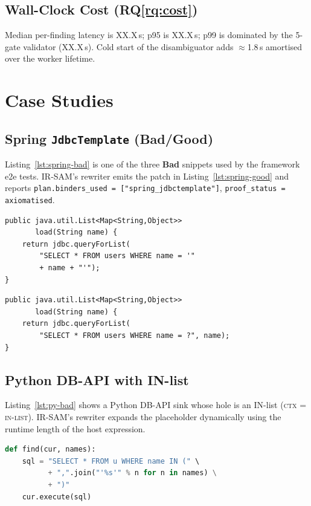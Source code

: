 \documentclass[conference]{IEEEtran}
\newcommand{\IRSAM}{\textsc{IR-SAM}}
\newcommand{\rqref}[1]{RQ\ref{rq:#1}}
\begin{document}
\subsection{Wall-Clock Cost (\rqref{cost})}
Median per-finding latency is XX.X\,s; p95 is XX.X\,s; p99 is
dominated by the 5-gate validator (XX.X\,s).  Cold start of the
disambiguator adds $\approx$1.8\,s amortised over the worker
lifetime.

\section{Case Studies}\label{sec:cases}

\subsection{Spring \texttt{JdbcTemplate} (Bad/Good)}
Listing~\ref{lst:spring-bad} is one of the three \textbf{Bad}
snippets used by the framework e2e tests.  \IRSAM{}'s rewriter
emits the patch in Listing~\ref{lst:spring-good} and reports
\texttt{plan.binders\_used = ["spring\_jdbctemplate"]},
\texttt{proof\_status = axiomatised}.

\begin{lstlisting}[style=code,
  caption={Spring JdbcTemplate -- concatenated query (Bad).},
  label={lst:spring-bad}]
public java.util.List<Map<String,Object>>
       load(String name) {
    return jdbc.queryForList(
        "SELECT * FROM users WHERE name = '"
        + name + "'");
}
\end{lstlisting}

\begin{lstlisting}[style=code,
  caption={Spring JdbcTemplate -- parameterised (\IRSAM{} patch).},
  label={lst:spring-good}]
public java.util.List<Map<String,Object>>
       load(String name) {
    return jdbc.queryForList(
        "SELECT * FROM users WHERE name = ?", name);
}
\end{lstlisting}

\subsection{Python DB-API with IN-list}
Listing~\ref{lst:py-bad} shows a Python DB-API sink whose hole is
an IN-list (\textsc{ctx} = \textsc{in-list}).
\IRSAM{}'s rewriter expands the placeholder dynamically using the
runtime length of the host expression.

\begin{lstlisting}[style=code,language=Python,
  caption={Python DB-API IN-list -- input (Bad).},
  label={lst:py-bad}]
def find(cur, names):
    sql = "SELECT * FROM u WHERE name IN (" \
          + ",".join("'%s'" % n for n in names) \
          + ")"
    cur.execute(sql)
\end{lstlisting}
\end{document}
